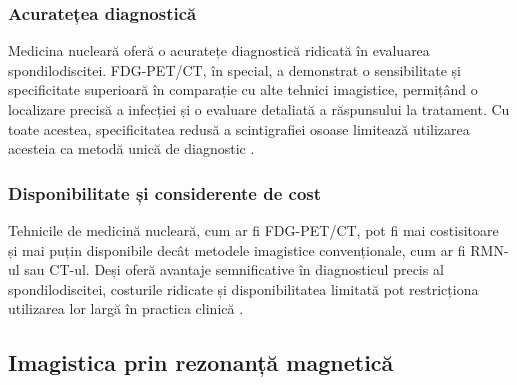 \message{ !name(LaMain.tex)}\documentclass[romanian,12pt,a4paper]{article}
\begin{document}
\subsubsection{Acuratețea diagnostică}

Medicina nucleară oferă o acuratețe diagnostică ridicată în evaluarea
spondilodiscitei. FDG-PET/CT, în special, a demonstrat o sensibilitate
și specificitate superioară în comparație cu alte tehnici imagistice,
permițând o localizare precisă a infecției și o evaluare detaliată a
răspunsului la tratament. Cu toate acestea, specificitatea redusă a
scintigrafiei osoase limitează utilizarea acesteia ca metodă unică de
diagnostic
\cite{RadionuclideImagingMusculoskeletal2016}\cite{RoleNuclearMedicine2012}
.

\subsubsection{Disponibilitate și considerente de cost}

Tehnicile de medicină nucleară, cum ar fi FDG-PET/CT, pot fi mai
costisitoare și mai puțin disponibile decât metodele imagistice
convenționale, cum ar fi RMN-ul sau CT-ul. Deși oferă avantaje
semnificative în diagnosticul precis al spondilodiscitei, costurile
ridicate și disponibilitatea limitată pot restricționa utilizarea lor
largă în practica clinică \cite{ImagingAssessmentSpine2024}.

\subsection{Imagistica prin rezonanță magnetică}
\end{document}
